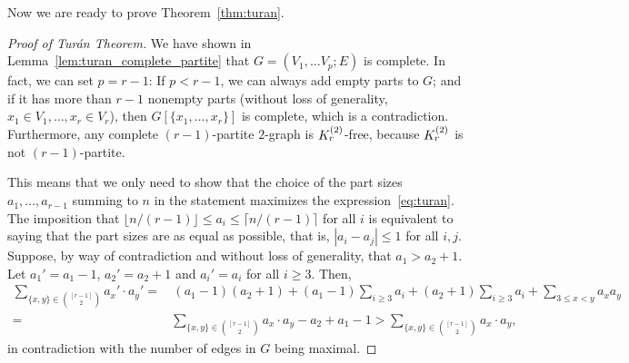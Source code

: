 Now we are ready to prove Theorem~\ref{thm:turan}.
\begin{proof}[Proof of Turán Theorem]
    We have shown in Lemma~\ref{lem:turan_complete_partite} that $G = (V_1, \dots V_p; E)$ is complete.
    In fact, we can set $p = r - 1$:
    If $p < r - 1$, we can always add empty parts to $G$; and if it has more than $r - 1$ nonempty parts
    (without loss of generality, $x_1 \in V_1, \dots, x_r \in V_r$), then $G[\{x_1, \dots, x_r\}]$ is complete,
    which is a contradiction.
    Furthermore, any complete $(r-1)$-partite $2$-graph is $K^{(2)}_{r}$-free,
    because $K^{(2)}_{r}$ is not $(r-1)$-partite.

    This means that we only need to show that the choice of the part sizes $a_1, \dots, a_{r-1}$ summing to $n$
    in the statement maximizes the expression~\eqref{eq:turan}.
    The imposition that $\lfloor n / (r-1) \rfloor \leq a_i \leq \lceil n / (r-1) \rceil$ for all $i$
    is equivalent to saying that the part sizes are as equal as possible, that is,
    $|a_i - a_j| \leq 1$ for all $i, j$.
    Suppose, by way of contradiction and without loss of generality, that $a_1 > a_2 + 1$.
    Let $a_1' = a_1 - 1$, $a_2' = a_2 + 1$ and $a_i' = a_i$ for all $i \geq 3$.
    Then,
    \begin{align*}
        \sum_{\{x, y\} \in \binom{[r-1]}{2}} a_x' \cdot a_y'
        =& \, (a_1 - 1)(a_2 + 1) + (a_1 - 1) \sum_{i \geq 3} a_i + (a_2 + 1) \sum_{i \geq 3} a_i + \sum_{3 \leq x < y} a_x a_y \\
        =& \sum_{\{x, y\} \in \binom{[r-1]}{2}} a_x \cdot a_y - a_2 + a_1 - 1
        > \sum_{\{x, y\} \in \binom{[r-1]}{2}} a_x \cdot a_y,
    \end{align*}
    in contradiction with the number of edges in $G$ being maximal.
\end{proof}

